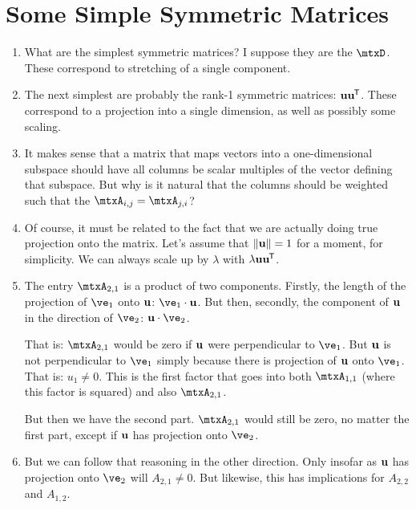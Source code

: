 \documentclass[11pt, oneside]{amsart}
\begin{document}
\section{Some Simple Symmetric Matrices}

\begin{enumerate}
  \item What are the simplest symmetric matrices? I suppose they are the
   $\mtxD$. These correspond to stretching of
  a single component.

  \item The next simplest are probably the rank-1 symmetric matrices:
  $\bm{\mathrm{u}} \bm{\mathrm{u}}^{\mkern-1.5mu\mathsf{T}}$. These correspond to a projection into a single
  dimension, as well as possibly some scaling.

  \item It makes sense that a matrix that maps vectors into a
  one-dimensional subspace should have all columns be scalar multiples
  of the vector defining that subspace. But why is it natural that the
  columns should be weighted such that the $\mtxA_{i, j} = \mtxA_{j,
  i}$?

  \item Of course, it must be related to the fact that we are actually
  doing true projection onto the matrix. Let's assume that $\left\Vert \bm{\mathrm{u}} \right\Vert =
  1$ for a moment, for simplicity. We can always scale up by $\lambda$
  with $\lambda \bm{\mathrm{u}}\bm{\mathrm{u}}^{\mkern-1.5mu\mathsf{T}}$.

  \item The entry $\mtxA_{2, 1}$ is a product of two components. Firstly,
  the length of the projection of $\ve_1$ onto $\bm{\mathrm{u}}$: $\ve_1 \cdot \vu$.
  But then, secondly, the component of $\bm{\mathrm{u}}$ in the direction of
  $\ve_2$: $\vu \cdot \ve_2$.

  That is: $\mtxA_{2, 1}$ would be zero if $\bm{\mathrm{u}}$ were perpendicular to
  $\ve_1$. But $\bm{\mathrm{u}}$ is not perpendicular to $\ve_1$ simply because
  there is projection of $\bm{\mathrm{u}}$ onto $\ve_1$. That is: $u_1 \ne 0$. This
  is the first factor that goes into both $\mtxA_{1, 1}$ (where this
  factor is squared) and also $\mtxA_{2, 1}$.

  But then we have the second part. $\mtxA_{2, 1}$ would still be zero,
  no matter the first part, except if $\bm{\mathrm{u}}$ has projection onto $\ve_2$.

  \item But we can follow that reasoning in the other direction. Only
  insofar as $\bm{\mathrm{u}}$ has projection onto $\ve_2$ will $A_{2, 1} \ne 0$.
  But likewise, this has implications for $A_{2, 2}$ and $A_{1, 2}$.


\end{enumerate}
\end{document}
